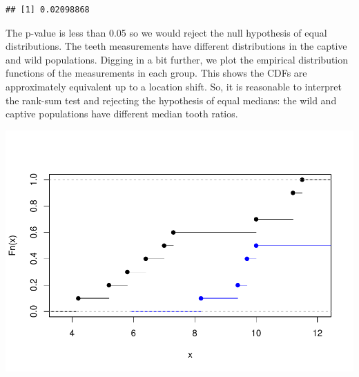 \documentclass[
]{book}
\newenvironment{Shaded}{\begin{snugshade}}{\end{snugshade}}
\newcommand{\AttributeTok}[1]{\textcolor[rgb]{0.77,0.63,0.00}{#1}}
\newcommand{\DecValTok}[1]{\textcolor[rgb]{0.00,0.00,0.81}{#1}}
\newcommand{\FunctionTok}[1]{\textcolor[rgb]{0.00,0.00,0.00}{#1}}
\newcommand{\NormalTok}[1]{#1}
\newcommand{\OtherTok}[1]{\textcolor[rgb]{0.56,0.35,0.01}{#1}}
\newcommand{\SpecialCharTok}[1]{\textcolor[rgb]{0.00,0.00,0.00}{#1}}
\newcommand{\StringTok}[1]{\textcolor[rgb]{0.31,0.60,0.02}{#1}}
\begin{document}
\begin{verbatim}
## [1] 0.02098868
\end{verbatim}

The p-value is less than 0.05 so we would reject the null hypothesis of equal distributions. The teeth measurements have different distributions in the captive and wild populations. Digging in a bit further, we plot the empirical distribution functions of the measurements in each group. This shows the CDFs are approximately equivalent up to a location shift. So, it is reasonable to interpret the rank-sum test and rejecting the hypothesis of equal medians: the wild and captive populations have different median tooth ratios.

\begin{Shaded}
\end{Shaded}

\includegraphics{04-Non-Normal-Responses_files/figure-latex/unnamed-chunk-9-1.pdf}
\end{document}
